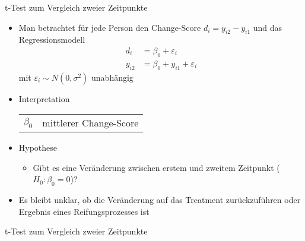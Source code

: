 \documentclass{beamer}
\begin{document}
\begin{frame}{t-Test zum Vergleich zweier Zeitpunkte}
\begin{itemize}
  \item Man betrachtet für jede Person den Change-Score $d_i = y_{i2} - y_{i1}$ und das Regressionsmodell
    {\color{iwmorange}\begin{align*}
         d_i &= \beta_0 + \varepsilon_i \\
      y_{i2} &= \beta_0 + y_{i1} + \varepsilon_i
    \end{align*}}
    mit $\varepsilon_i \sim N(0, \sigma^2)$ unabhängig
  \item Interpretation
    \begin{center}
    \begin{tabular}{ll}
    $\beta_0$ & mittlerer Change-Score
    \end{tabular}
    \end{center}
  \item Hypothese
    \begin{itemize}
        \item Gibt es eine Veränderung zwischen erstem und zweitem Zeitpunkt ($H_0\colon \beta_0 = 0$)?
    \end{itemize}
  \item Es bleibt unklar, ob die Veränderung auf das Treatment zurückzuführen oder Ergebnis eines Reifungsprozesses ist
\end{itemize}
\end{frame}


\begin{frame}{t-Test zum Vergleich zweier Zeitpunkte}
\begin{center}
\end{center}
\end{frame}
\end{document}
